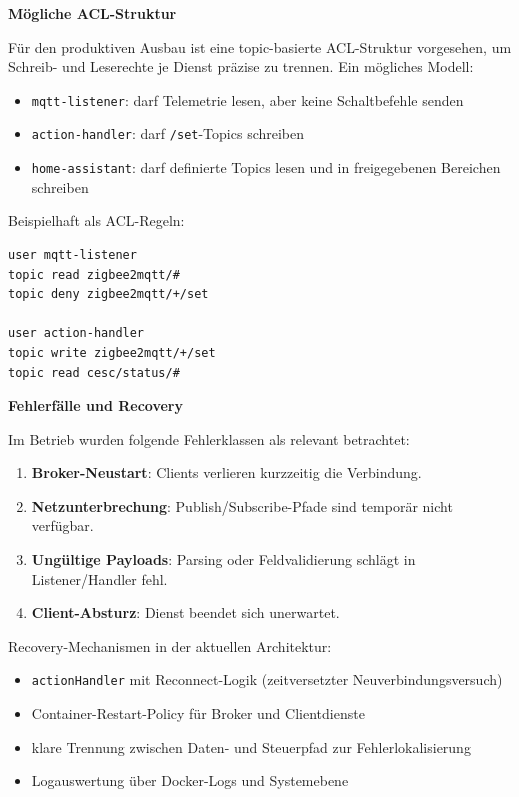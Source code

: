 \textbf{Mögliche ACL-Struktur}

Für den produktiven Ausbau ist eine topic-basierte ACL-Struktur vorgesehen, um Schreib- und Leserechte je Dienst präzise zu trennen. Ein mögliches Modell:

\begin{itemize}
    \item \texttt{mqtt-listener}: darf Telemetrie lesen, aber keine Schaltbefehle senden
    \item \texttt{action-handler}: darf \texttt{/set}-Topics schreiben
    \item \texttt{home-assistant}: darf definierte Topics lesen und in freigegebenen Bereichen schreiben
\end{itemize}

Beispielhaft als ACL-Regeln:

\begin{lstlisting}[language=bash,caption={Beispiel einer topic-basierten ACL-Trennung},label={lst:mqtt_acl_example},basicstyle=\ttfamily\small]
user mqtt-listener
topic read zigbee2mqtt/#
topic deny zigbee2mqtt/+/set

user action-handler
topic write zigbee2mqtt/+/set
topic read cesc/status/#
\end{lstlisting}

\textbf{Fehlerfälle und Recovery}

Im Betrieb wurden folgende Fehlerklassen als relevant betrachtet:

\begin{enumerate}
    \item \textbf{Broker-Neustart}: Clients verlieren kurzzeitig die Verbindung.
    \item \textbf{Netzunterbrechung}: Publish/Subscribe-Pfade sind temporär nicht verfügbar.
    \item \textbf{Ungültige Payloads}: Parsing oder Feldvalidierung schlägt in Listener/Handler fehl.
    \item \textbf{Client-Absturz}: Dienst beendet sich unerwartet.
\end{enumerate}

Recovery-Mechanismen in der aktuellen Architektur:

\begin{itemize}
    \item \texttt{actionHandler} mit Reconnect-Logik (zeitversetzter Neuverbindungsversuch)
    \item Container-Restart-Policy für Broker und Clientdienste
    \item klare Trennung zwischen Daten- und Steuerpfad zur Fehlerlokalisierung
    \item Logauswertung über Docker-Logs und Systemebene
\end{itemize}

